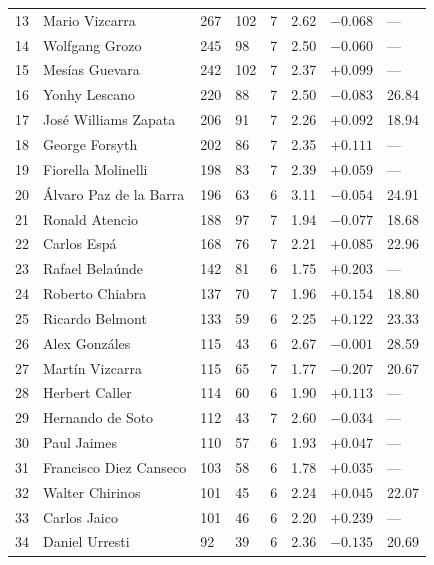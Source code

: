 \begin{table}[h!]
\begin{longtable}{ m{0.5cm}m{3.6cm}M{1.2cm}M{1.1cm}M{1.2cm}M{1.3cm}M{1.4cm}M{1.2cm} }
        13 & Mario Vizcarra         & 267 & 102 & 7 & 2.62 & $-0.068$ & — \\
        14 & Wolfgang Grozo         & 245 & 98  & 7 & 2.50 & $-0.060$ & — \\
        15 & Mesías Guevara         & 242 & 102 & 7 & 2.37 & $+0.099$ & — \\
        16 & Yonhy Lescano          & 220 & 88  & 7 & 2.50 & $-0.083$ & 26.84 \\
        17 & José Williams Zapata   & 206 & 91  & 7 & 2.26 & $+0.092$ & 18.94 \\
        18 & George Forsyth         & 202 & 86  & 7 & 2.35 & $+0.111$ & — \\
        19 & Fiorella Molinelli     & 198 & 83  & 7 & 2.39 & $+0.059$ & — \\
        20 & Álvaro Paz de la Barra & 196 & 63  & 6 & 3.11 & $-0.054$ & 24.91 \\
        21 & Ronald Atencio         & 188 & 97  & 7 & 1.94 & $-0.077$ & 18.68 \\
        22 & Carlos Espá            & 168 & 76  & 7 & 2.21 & $+0.085$ & 22.96 \\
        23 & Rafael Belaúnde        & 142 & 81  & 6 & 1.75 & $+0.203$ & — \\
        24 & Roberto Chiabra        & 137 & 70  & 7 & 1.96 & $+0.154$ & 18.80 \\
        25 & Ricardo Belmont        & 133 & 59  & 6 & 2.25 & $+0.122$ & 23.33 \\
        26 & Alex Gonzáles          & 115 & 43  & 6 & 2.67 & $-0.001$ & 28.59 \\
        27 & Martín Vizcarra        & 115 & 65  & 7 & 1.77 & $-0.207$ & 20.67 \\
        28 & Herbert Caller         & 114 & 60  & 6 & 1.90 & $+0.113$ & — \\
        29 & Hernando de Soto       & 112 & 43  & 7 & 2.60 & $-0.034$ & — \\
        30 & Paul Jaimes            & 110 & 57  & 6 & 1.93 & $+0.047$ & — \\
        31 & Francisco Diez Canseco & 103 & 58  & 6 & 1.78 & $+0.035$ & — \\
        32 & Walter Chirinos        & 101 & 45  & 6 & 2.24 & $+0.045$ & 22.07 \\
        33 & Carlos Jaico           & 101 & 46  & 6 & 2.20 & $+0.239$ & — \\
        34 & Daniel Urresti         & 92  & 39  & 6 & 2.36 & $-0.135$ & 20.69 \\

\end{longtable}
\end{table}
